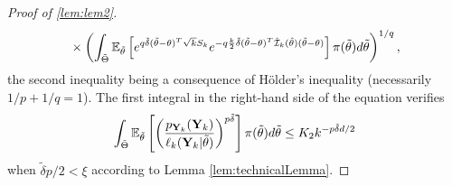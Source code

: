 \begin{proof}[Proof of \cref{lem:lem2}]
\begin{align}
           & \quad\times\left(\int_{\tilde\Theta} \mathbb{E}_{\tilde\theta}\left[   e^{q{\tilde\delta}(\tilde\theta-\theta)^T\sqrt{k}S_k} e^{-q\frac{k}{2}{\tilde\delta}(\tilde\theta-\theta)^T\hat{\mathcal{I}}_k(\hat\theta)(\tilde\theta-\theta)} \right] \pi(\tilde\theta) d\tilde\theta\right)^{1/q},
    \end{align}
the second inequality being a consequence of Hölder's inequality (necessarily $1/p+1/q=1$).
The first integral in the right-hand side of the equation verifies
    \begin{align}
        \int_{\tilde\Theta} \mathbb{E}_{\tilde\theta} \left[ \left( \frac{p_{\mathbf{Y}_k}(\mathbf{Y}_k)}{\ell_k(\mathbf{Y}_k|\tilde\theta)} \right)^{p{\tilde\delta}}\right] \pi(\tilde\theta)d\tilde\theta \leq K_2 k^{-p{\tilde\delta} d/2}  
    \end{align}
when ${\tilde\delta} p/2<\xi$ according to Lemma \ref{lem:technicalLemma}.


\end{proof}
